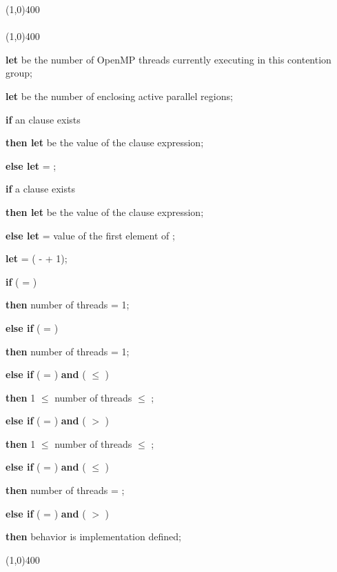 \begin{samepage}
\nolinenumbers\line(1,0){400}\\[.4\baselineskip]
\\[-0.5\baselineskip]
\line(1,0){400}\linenumbers

\textbf{let}  be the number of OpenMP threads currently executing in
this contention group;

\textbf{let}  be the number of enclosing active parallel regions;

\textbf{if} an  clause exists

\textbf{then let}  be the value of the  clause expression;

\textbf{else let}  = ;

\textbf{if} a  clause exists

\textbf{then let}  be the value of the  clause
expression;

\textbf{else let}  = value of the first element of ;

\textbf{let}  = ( -  + 1);

\textbf{if} ( = )

\textbf{then} number of threads = 1;

\textbf{else if} ( = )

\textbf{then} number of threads = 1;

\textbf{else if} ( = ) \textbf{and} ( $\leq$ )

\textbf{then} 1 $\leq$ number of threads $\leq$ ;

\textbf{else if} ( = ) \textbf{and} ( $>$ )

\textbf{then} 1 $\leq$ number of threads $\leq$ ;

\textbf{else if} ( = ) \textbf{and} ( $\leq$ )

\textbf{then} number of threads = ;

\textbf{else if} ( = ) \textbf{and} ( $>$ )

\textbf{then} behavior is implementation defined;

\nolinenumbers\line(1,0){400}\linenumbers
\end{samepage}
\bigskip

